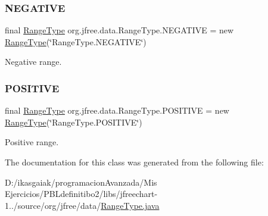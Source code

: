 \subsubsection{\texorpdfstring{N\+E\+G\+A\+T\+I\+VE}{NEGATIVE}}
{\footnotesize\ttfamily final \mbox{\hyperlink{classorg_1_1jfree_1_1data_1_1_range_type}{Range\+Type}} org.\+jfree.\+data.\+Range\+Type.\+N\+E\+G\+A\+T\+I\+VE = new \mbox{\hyperlink{classorg_1_1jfree_1_1data_1_1_range_type}{Range\+Type}}(\char`\"{}Range\+Type.\+N\+E\+G\+A\+T\+I\+VE\char`\"{})\hspace{0.3cm}{\ttfamily [static]}}

Negative range. \mbox{\label{classorg_1_1jfree_1_1data_1_1_range_type_a155e925e59fa5fbdd37bb83bdd7cb08c}} 
\subsubsection{\texorpdfstring{P\+O\+S\+I\+T\+I\+VE}{POSITIVE}}
{\footnotesize\ttfamily final \mbox{\hyperlink{classorg_1_1jfree_1_1data_1_1_range_type}{Range\+Type}} org.\+jfree.\+data.\+Range\+Type.\+P\+O\+S\+I\+T\+I\+VE = new \mbox{\hyperlink{classorg_1_1jfree_1_1data_1_1_range_type}{Range\+Type}}(\char`\"{}Range\+Type.\+P\+O\+S\+I\+T\+I\+VE\char`\"{})\hspace{0.3cm}{\ttfamily [static]}}

Positive range. 

The documentation for this class was generated from the following file\+:\begin{DoxyCompactItemize}
\item 
D\+:/ikasgaiak/programacion\+Avanzada/\+Mis Ejercicios/\+P\+B\+Ldefinitibo2/libs/jfreechart-\/1../source/org/jfree/data/\mbox{\hyperlink{_range_type_8java}{Range\+Type.\+java}}\end{DoxyCompactItemize}
